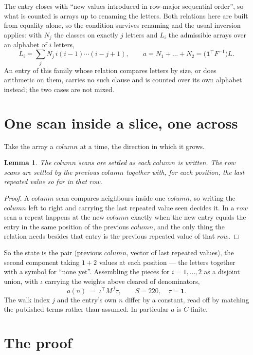 \documentclass[11pt,a4paper]{article}
\theoremstyle{plain}
\newtheorem{lemma}[theorem]{Lemma}
\theoremstyle{definition}
\begin{document}
The entry closes with ``new values introduced in row-major sequential order'', so what is
counted is arrays up to renaming the letters. Both relations here are built from equality
alone, so the condition survives renaming and the usual inversion applies: with $N_j$ the
classes on exactly $j$ letters and $L_i$ the admissible arrays over an alphabet of $i$ letters,
\[
L_i=\sum_j N_j\,i(i-1)\cdots(i-j+1),\qquad
a=N_1+\dots+N_{2}=\bigl(\mathbf{1}^{\!\top}F^{-1}\bigr)L .
\]
An entry of this family whose relation compares letters by size, or does arithmetic on them,
carries no such clause and is counted over its own alphabet instead; the two cases are not
mixed.

\section{One scan inside a slice, one across}

Take the array a $column$ at a time, the direction in which it grows.

\begin{lemma}\label{lem:state}
The $column$ scans are settled as each $column$ is written. The $row$ scans are
settled by the previous $column$ together with, for each position, the last repeated value
so far in that $row$.
\end{lemma}

\begin{proof}
A $column$ scan compares neighbours inside one $column$, so writing the
$column$ left to right and carrying the last repeated value seen decides it. In a
$row$ scan a repeat happens at the new $column$ exactly when the new entry equals the
entry in the same position of the previous $column$, and the only thing the relation needs
besides that entry is the previous repeated value of that $row$.
\end{proof}

So the state is the pair (previous $column$, vector of last repeated values), the second
component taking $1+2$ values at each position --- the letters together with a symbol for
``none yet''. Assembling the pieces for $i=1,\dots,2$ as a disjoint union, with $\iota$ carrying the weights above cleared of denominators,
\[
a(n)\;=\;\iota^{\!\top}M^{\,j}\tau ,\qquad S=220,\quad\tau=\mathbf{1} .
\]
The walk index $j$ and the entry's own $n$ differ by a constant, read off by matching the
published terms rather than assumed. In particular $a$ is $C$-finite.

\section{The proof}
\end{document}
